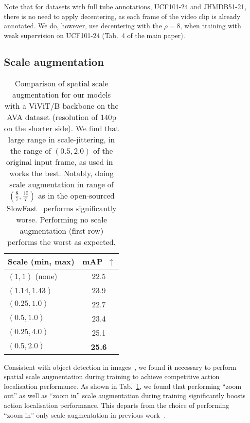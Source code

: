 \documentclass[10pt,twocolumn,letterpaper]{article}
\begin{document}
Note that for datasets with full tube annotations, \ie UCF101-24 and JHMDB51-21, there is no need to apply decentering, as each frame of the video clip is already annotated.
We do, however, use decentering with the $\rho = 8$, when training with weak supervision on UCF101-24 (Tab.~4 of the main paper).

    
\subsection{Scale augmentation}
\label{sec:scale_aug}
\begin{table}[t]
\centering
\caption{Comparison of spatial scale augmentation for our models with a ViViT/B backbone on the AVA dataset (resolution of 140p on the shorter side).
We find that large range in scale-jittering, in the range of $(0.5, 2.0)$ of the original input frame, as used in~\cite{ghiasi2021simple} works the best.
Notably, doing scale augmentation in range of $(\frac{8}{7}, \frac{10}{7})$ as in the open-sourced SlowFast~\cite{feichtenhofer_iccv_2019} performs significantly worse.
Performing no scale augmentation (first row) performs the worst as expected.
}
\begin{tabular}{lc}
\toprule
Scale (min, max) & mAP~$\uparrow$ \\  \midrule
$(1, 1)$ (none) & 22.5 \\  $(1.14, 1.43)$~\cite{feichtenhofer_iccv_2019} & 23.9 \\  \midrule
$(0.25, 1.0)$         &  22.7  \\
$(0.5, 1.0)$          &  23.4  \\
$(0.25, 4.0)$         &  25.1  \\
$(0.5, 2.0)$          &  \textbf{25.6}  \\
\bottomrule
\end{tabular}
\label{tab:ablation_scale_aug}
\end{table}
 Consistent with object detection in images~\cite{ghiasi2021simple,lin2017focal,cubuk_arxiv_2019,singh2018sniper}, we found it necessary to perform spatial scale augmentation during training to achieve competitive action localisation performance.
As shown in Tab.~\ref{tab:ablation_scale_aug}, we found that performing ``zoom out'' as well as ``zoom in'' scale augmentation during training significantly boosts action localisation performance.
This departs from the choice of performing ``zoom in'' only scale augmentation in previous work~\cite{feichtenhofer_iccv_2019, wu2022memvit, wu_cvpr_2019}.
\end{document}
